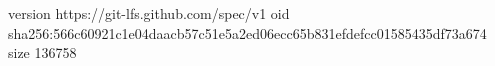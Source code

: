 version https://git-lfs.github.com/spec/v1
oid sha256:566c60921c1e04daacb57c51e5a2ed06ecc65b831efdefcc01585435df73a674
size 136758
